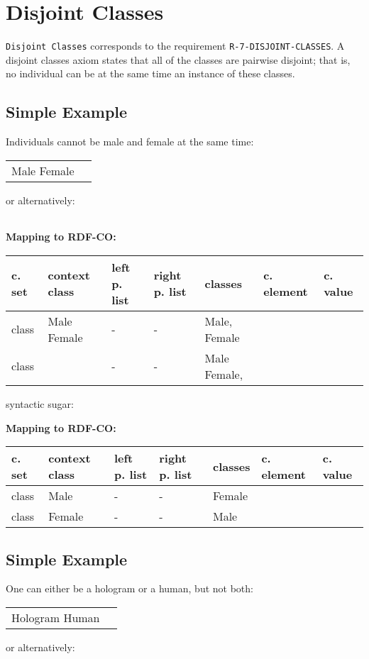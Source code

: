 \documentclass{llncs}
\newcommand{\ms}[1]{\texttt{#1}}
\newenvironment{gcotable}{
  \scriptsize
  \sffamily
  \vspace{0cm}
	\begin{center}
	\textbf{\vspace{0.4cm}Mapping to RDF-CO:} \\
  \begin{tabular}{l|l|l|l|l|l|l}
	\hline
  \textbf{c. set} & \textbf{context class} & \textbf{left p. list} & \textbf{right p. list} & \textbf{classes} & \textbf{c. element} & \textbf{c. value} \\
  \hline

}{
  \hline
  \end{tabular}
	\end{center}
}
\newenvironment{DL}{
\vspace{0cm}
	\begin{center}
  \begin{tabular}{r l}

}{
  \end{tabular}
	\end{center}
}
\begin{document}
\section{Disjoint Classes}

\ms{Disjoint Classes} corresponds to the requirement \ms{R-7-DISJOINT-CLASSES}.
A disjoint classes axiom states that all of the classes are pairwise disjoint; 
that is, no individual can be at the same time an instance of these classes. 

\subsection{Simple Example}

Individuals cannot be male and female at the same time:

\begin{DL}
Male  Female  \\
\end{DL}

or alternatively:

\begin{DL}

\end{DL}

\begin{gcotable}
class & Male  Female & - & - & Male, Female &   \\
class &  & - & - & Male  Female,  &  \\
\end{gcotable}

syntactic sugar:

\begin{gcotable}
class & Male & - & - & Female &  \\
class & Female & - & - & Male &  \\
\end{gcotable}

\subsection{Simple Example}

One can either be a hologram or a human, but not both:

\begin{DL}
Hologram  Human  \\
\end{DL}

or alternatively:

\begin{DL}

\end{DL}
\end{document}
